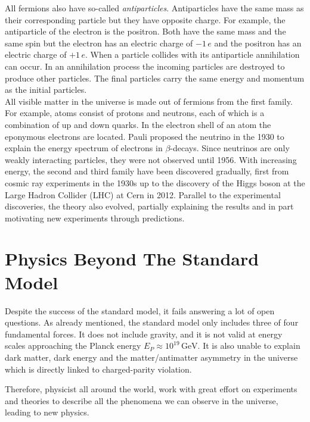\documentclass[a4paper,11pt,twosided,final,german,openbib,pdftex,listof=totoc,bibliography=totoc]{scrbook}
\begin{document}
All fermions also have so-called \textit{antiparticles}. Antiparticles have the same mass as their corresponding particle but they have opposite charge. For example, the antiparticle of the electron is the positron. Both have the same mass and the same spin but the electron has an electric charge of $-1\,e$ and the positron has an electric charge of $+1\,e$. When a particle collides with its antiparticle annihilation can occur. In an annihilation process the incoming particles are destroyed to produce other particles. The final particles carry the same energy and momentum as the initial particles.\\


All visible matter in the universe is made out of fermions from the first family. For example, atoms consist of protons and neutrons, each of which is a combination of up and down quarks. In the electron shell of an atom the eponymous electrons are located. Pauli proposed the neutrino in the 1930 to explain the energy spectrum of electrons in $\beta$-decays. Since neutrinos are only weakly interacting particles, they were not observed until 1956.\cite{REINES19941} With increasing energy, the second and third family have been discovered gradually, first from cosmic ray experiments in the 1930s up to the discovery of the Higgs boson at the Large Hadron Collider (LHC) at Cern in 2012. Parallel to the experimental discoveries, the theory also evolved, partially explaining the results and in part motivating new experiments through predictions.


\section{Physics Beyond The Standard Model}

Despite the success of the standard model, it fails answering a lot of open questions. As already mentioned, the standard model only includes three of four fundamental forces. It does not include gravity, and it is not valid at energy scales approaching the Planck energy $E_P \approx 10^{19}\,\textrm{GeV} $.\cite{sivaram2007special} It is also unable to explain dark matter, dark energy and the matter/antimatter asymmetry in the universe which is directly linked to charged-parity violation.\cite{HAMBYE2012193}

Therefore, physicist all around the world, work with great effort on experiments and theories to describe all the phenomena we can observe in the universe, leading to new physics.
\end{document}

